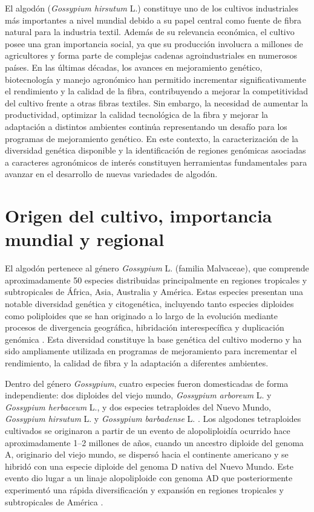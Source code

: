 \documentclass[12pt,oneside]{reedthesis}
\begin{document}
El algodón (\emph{Gossypium hirsutum} L.) constituye uno de los cultivos industriales más importantes a nivel mundial debido a su papel central como fuente de fibra natural para la industria textil. Además de su relevancia económica, el cultivo posee una gran importancia social, ya que su producción involucra a millones de agricultores y forma parte de complejas cadenas agroindustriales en numerosos países. En las últimas décadas, los avances en mejoramiento genético, biotecnología y manejo agronómico han permitido incrementar significativamente el rendimiento y la calidad de la fibra, contribuyendo a mejorar la competitividad del cultivo frente a otras fibras textiles. Sin embargo, la necesidad de aumentar la productividad, optimizar la calidad tecnológica de la fibra y mejorar la adaptación a distintos ambientes continúa representando un desafío para los programas de mejoramiento genético. En este contexto, la caracterización de la diversidad genética disponible y la identificación de regiones genómicas asociadas a caracteres agronómicos de interés constituyen herramientas fundamentales para avanzar en el desarrollo de nuevas variedades de algodón.

\section{Origen del cultivo, importancia mundial y regional}\label{origen-del-cultivo-importancia-mundial-y-regional}

El algodón pertenece al género \emph{Gossypium} L. (familia Malvaceae), que comprende aproximadamente 50 especies distribuidas principalmente en regiones tropicales y subtropicales de África, Asia, Australia y América. Estas especies presentan una notable diversidad genética y citogenética, incluyendo tanto especies diploides como poliploides que se han originado a lo largo de la evolución mediante procesos de divergencia geográfica, hibridación interespecífica y duplicación genómica \autocite{grover2015}. Esta diversidad constituye la base genética del cultivo moderno y ha sido ampliamente utilizada en programas de mejoramiento para incrementar el rendimiento, la calidad de fibra y la adaptación a diferentes ambientes.

Dentro del género \emph{Gossypium}, cuatro especies fueron domesticadas de forma independiente: dos diploides del viejo mundo, \emph{Gossypium arboreum} L. y \emph{Gossypium herbaceum} L., y dos especies tetraploides del Nuevo Mundo, \emph{Gossypium hirsutum} L. y \emph{Gossypium barbadense} L. \autocite{wendel2010}. Los algodones tetraploides cultivados se originaron a partir de un evento de alopoliploidía ocurrido hace aproximadamente 1--2 millones de años, cuando un ancestro diploide del genoma A, originario del viejo mundo, se dispersó hacia el continente americano y se hibridó con una especie diploide del genoma D nativa del Nuevo Mundo. Este evento dio lugar a un linaje alopoliploide con genoma AD que posteriormente experimentó una rápida diversificación y expansión en regiones tropicales y subtropicales de América \autocite{grover2015}.
\end{document}
